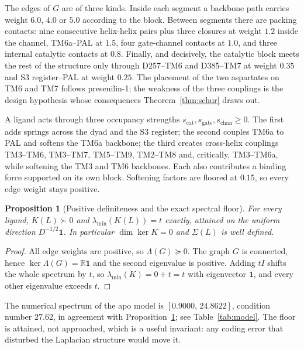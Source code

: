 \documentclass[11pt,reqno]{amsart}
\theoremstyle{plain}
\newtheorem{proposition}[theorem]{Proposition}
\theoremstyle{definition}
\theoremstyle{remark}
\numberwithin{equation}{section}
\begin{document}
The edges of $G$ are of three kinds. Inside each segment a backbone path carries weight $6.0$, $4.0$ or $5.0$ according to the block. Between segments there are packing contacts: nine consecutive helix-helix pairs plus three closures at weight $1.2$ inside the channel, TM6a--PAL at $1.5$, four gate-channel contacts at $1.0$, and three internal catalytic contacts at $0.8$. Finally, and decisively, the catalytic block meets the rest of the structure only through D257--TM6 and D385--TM7 at weight $0.35$ and S3 register--PAL at weight $0.25$. The placement of the two aspartates on TM6 and TM7 follows presenilin-1; the weakness of the three couplings is the design hypothesis whose consequences Theorem~\ref{thm:schur} draws out.

A ligand acts through three occupancy strengths $s_{\mathrm{cat}},s_{\mathrm{gate}},s_{\mathrm{chan}}\ge0$. The first adds springs across the dyad and the S3 register; the second couples TM6a to PAL and softens the TM6a backbone; the third creates cross-helix couplings TM3--TM6, TM3--TM7, TM5--TM9, TM2--TM8 and, critically, TM3--TM6a, while softening the TM3 and TM6 backbones. Each also contributes a binding force supported on its own block. Softening factors are floored at $0.15$, so every edge weight stays positive.

\begin{proposition}[Positive definiteness and the exact spectral floor]
\label{prop:pd}
For every ligand, $K(L)\succ0$ and $\lambda_{\min}(K(L))=t$ exactly, attained on the uniform direction $D^{-1/2}\mathbf{1}$. In particular $\dim\ker K=0$ and $\Sigma(L)$ is well defined.
\end{proposition}

\begin{proof}
All edge weights are positive, so $\Lambda(G)\succeq0$. The graph $G$ is connected, hence $\ker\Lambda(G)=\mathbb{R}\mathbf{1}$ and the second eigenvalue is positive. Adding $tI$ shifts the whole spectrum by $t$, so $\lambda_{\min}(K)=0+t=t$ with eigenvector $\mathbf{1}$, and every other eigenvalue exceeds $t$.
\end{proof}

The numerical spectrum of the apo model is $[0.9000,\,24.8622]$, condition number $27.62$, in agreement with Proposition~\ref{prop:pd}; see Table~\ref{tab:model}. The floor is attained, not approached, which is a useful invariant: any coding error that disturbed the Laplacian structure would move it.
\end{document}
